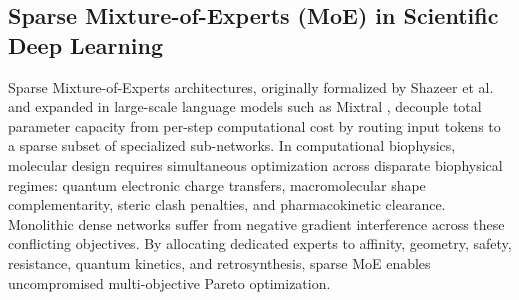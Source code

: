 \documentclass[10pt,journal,compsoc]{IEEEtran}
\begin{document}
\subsection{Sparse Mixture-of-Experts (MoE) in Scientific Deep Learning}
Sparse Mixture-of-Experts architectures, originally formalized by Shazeer et al.\ \cite{shazeer2017outrageously} and expanded in large-scale language models such as Mixtral \cite{jiang2024mixtral}, decouple total parameter capacity from per-step computational cost by routing input tokens to a sparse subset of specialized sub-networks. In computational biophysics, molecular design requires simultaneous optimization across disparate biophysical regimes: quantum electronic charge transfers, macromolecular shape complementarity, steric clash penalties, and pharmacokinetic clearance. Monolithic dense networks suffer from negative gradient interference across these conflicting objectives. By allocating dedicated experts to affinity, geometry, safety, resistance, quantum kinetics, and retrosynthesis, sparse MoE enables uncompromised multi-objective Pareto optimization.
\end{document}
